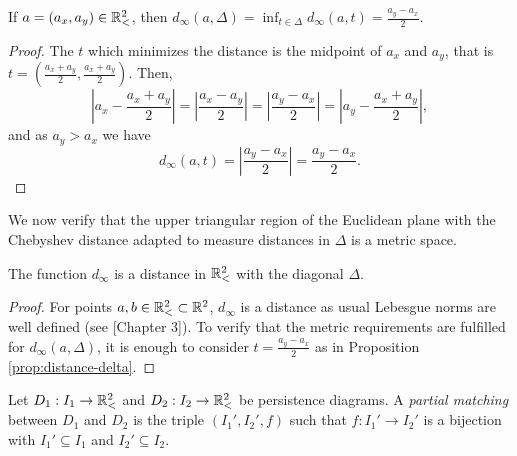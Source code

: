 \begin{proposition} \label{prop:distance-delta}
    If $ a = (a_x, a_y) \in \mathbb{R}_<^2 $, then $ d_\infty(a, \Delta) = \inf_{t \in \Delta} d_\infty(a, t) = \frac{a_y - a_x}{2} $.
\end{proposition}
\begin{proof}
    The $ t $ which minimizes the distance is the midpoint of $ a_x $ and $ a_y $, that is $t = \left(\frac{a_x+a_y}{2}, \frac{a_x+a_y}{2}\right)  $. Then,
    \begin{equation}
        \left| a_x - \frac{a_x+a_y}{2} \right| = \left| \frac{a_x-a_y}{2}\right| = \left| \frac{a_y-a_x}{2}\right| = \left| a_y - \frac{a_x+a_y}{2} \right|,
    \end{equation}
    and as $ a_y > a_x $ we have
    \begin{equation}
        d_\infty(a, t) = \left|\frac{a_y - a_x}{2}\right| = \frac{a_y - a_x}{2}.
    \end{equation}
\end{proof}

We now verify that the upper triangular region of the Euclidean plane with the Chebyshev distance adapted to measure distances in $ \Delta $ is a metric space.
\begin{proposition}
    The function $ d_\infty $ is a distance in $ \mathbb{R}_<^2 $ with the diagonal $ \Delta $.
\end{proposition}
\begin{proof}
    For points $ a, b \in \mathbb{R}_<^2 \subset \mathbb R^2 $, $ d_\infty $ is a distance as usual Lebesgue norms are well defined (see \cite{rudin}[Chapter 3]). To verify that the metric requirements are fulfilled for $ d_\infty(a, \Delta) $, it is enough to consider $ t = \frac{a_y - a_x}{2} $ as in Proposition \ref{prop:distance-delta}.
\end{proof}

\begin{definition}
    Let $ D_1: I_1 \to \mathbb{R}_<^2 $ and $ D_2: I_2 \to \mathbb{R}_<^2 $ be persistence diagrams. A {\it partial matching} between $ D_1 $ and $ D_2 $ is the triple $ (I_1', I_2', f) $ such that $ f: I_1' \to I_2' $ is a bijection with $ I_1' \subseteq I_1 $ and $ I_2' \subseteq I_2 $.
\end{definition}


